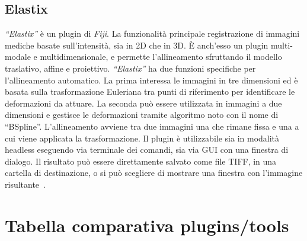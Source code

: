 \subsection{Elastix}
\noindent \textit{``Elastix''} è un plugin di \textit{Fiji}. La funzionalità principale registrazione di immagini mediche basate sull'intensità, sia in 2D che in 3D. 
È anch'esso un plugin multi-modale e multidimensionale, e permette l'allineamento sfruttando il modello traslativo, affine e proiettivo. \textit{``Elastix''} ha due funzioni specifiche per l’allineamento automatico. La prima interessa le immagini in tre dimensioni ed è basata sulla trasformazione Euleriana tra punti di riferimento per identificare le deformazioni da attuare. La seconda può essere utilizzata in immagini a due dimensioni e gestisce le deformazioni tramite algoritmo noto con il nome di “BSpline”. L'allineamento avviene tra due immagini una che rimane fissa e una a cui viene applicata la trasformazione. Il plugin è utilizzabile sia in modalità headless eseguendo via terminale dei comandi, sia via GUI con una finestra di dialogo. Il risultato può essere direttamente salvato come file TIFF, in una cartella di destinazione, o si può scegliere di mostrare una finestra con l'immagine risultante~\cite{5338015}.


\section{Tabella comparativa plugins/tools}

